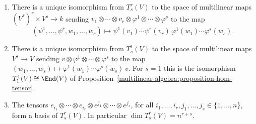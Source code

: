 \begin{proposition}\label{multilinear-algebra:proposition-tensors-multilinear}
\begin{enumerate}
\item There is a unique isomorphism from $T^r_s(V)$ to the space of multilinear maps $(V^*)^r \times V^s \to k$ sending
$v_1 \otimes \cdots \otimes v_r \otimes \varphi^1 \otimes \cdots \otimes \varphi^s$ to the map
\[
(\psi^1, \ldots, \psi^r, w_1, \ldots, w_s) \longmapsto \psi^1(v_1) \cdots \psi^r(v_r)\,\varphi^1(w_1) \cdots \varphi^s(w_s).
\]
\item There is a unique isomorphism from $T^1_s(V)$ to the space of multilinear maps $V^s \to V$ sending $v \otimes \varphi^1 \otimes \cdots \otimes \varphi^s$ to the map
$(w_1, \ldots, w_s) \mapsto \varphi^1(w_1) \cdots \varphi^s(w_s)\,v$. For $s = 1$ this is the isomorphism $T^1_1(V) \cong \End(V)$ of
Proposition~\ref{multilinear-algebra:proposition-hom-tensor}.
\item The tensors $e_{i_1} \otimes \cdots \otimes e_{i_r} \otimes e^{j_1} \otimes \cdots \otimes e^{j_s}$, for all $i_1, \ldots, i_r, j_1, \ldots, j_s \in \{1, \ldots, n\}$, form a basis of
$T^r_s(V)$. In particular $\dim T^r_s(V) = n^{r+s}$.
\end{enumerate}
\end{proposition}

